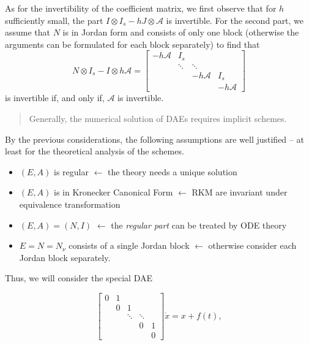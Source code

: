 \documentclass[]{book}
\providecommand{\tightlist}{%
  \setlength{\itemsep}{0pt}\setlength{\parskip}{0pt}}
\newenvironment {JHSAYS} [0] {\begin{quote}\color{jhsc}} {\end{quote}}
\theoremstyle{definition}
\theoremstyle{definition}
\theoremstyle{definition}
\theoremstyle{definition}
\theoremstyle{remark}
\begin{document}
As for the invertibility of the coefficient matrix, we first observe that for \(h\) sufficiently small, the part \(I\otimes I_s - hJ\otimes \mathcal A\) is invertible. For the second part, we assume that \(N\) is in Jordan form and consists of only one block (otherwise the arguments can be formulated for each block separately) to find that
\[
N\otimes I_s - I \otimes h \mathcal A = 
\begin{bmatrix}
-h\mathcal A & I_s \\
& \ddots & \ddots \\
&& -h\mathcal A & I_s \\
&&& -h\mathcal A
\end{bmatrix}
\]
is invertible if, and only if, \(\mathcal A\) is invertible.

\begin{JHSAYS}
Generally, the numerical solution of DAEs requires implicit schemes.
\end{JHSAYS}

By the previous considerations, the following assumptions are well justified -- at least for the theoretical analysis of the schemes.

\begin{itemize}
\tightlist
\item
  \((E,A)\) is regular \(\leftarrow\) the theory needs a unique solution
\item
  \((E,A)\) is in Kronecker Canonical Form \(\leftarrow\) RKM are invariant under equivalence transformation
\item
  \((E,A)=(N,I)\) \(\leftarrow\) the \emph{regular part} can be treated by ODE theory
\item
  \(E=N=N_\nu\) consists of a single Jordan block \(\leftarrow\) otherwise consider each Jordan block separately.
\end{itemize}

Thus, we will consider the special DAE

\begin{equation}
\begin{bmatrix}
0 & 1 &        &         &    \\
  & 0 & 1      &         &    \\
  &   & \ddots & \ddots  &    \\
  &   &        & 0       & 1  \\
  &   &        &         & 0 
\end{bmatrix}
\dot x = x + f(t),
\label{eq:spec-dae-rkm-cc}
\end{equation}
\end{document}
